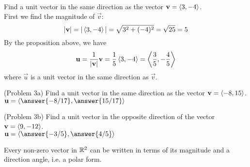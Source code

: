 \documentclass[handout]{ximera}
\begin{document}
\begin{example}[Example 3]
Find a unit vector in the same direction as the vector $\mathbf{v} = \left\langle 3, -4\right\rangle$.\\
First we find the magnitude of $\vec{v}$:
\[
|\mathbf{v}| = |\left\langle 3, -4\right\rangle| = \sqrt{3^2 + (-4)^2} = \sqrt{25} = 5
\]
By the proposition above, we have
\[
\mathbf{u} = \frac{1}{|\mathbf{v}|} \mathbf{v} = \frac15 \left\langle 3, -4\right\rangle = \left\langle \frac35, -\frac45\right\rangle
\]
where $\vec{u}$ is a unit vector in the same direction as $\vec{v}$.
\end{example}

\begin{problem}(Problem 3a)
Find a unit vector in the same direction as the vector $\mathbf{v} = \left\langle -8, 15\right\rangle$.\\
$\vec{u} = \vector{\answer{-8/17}, \answer{15/17}}$
\end{problem}

\begin{problem}(Problem 3b)
Find a unit vector in the opposite direction of the vector $\mathbf{v} = \left\langle 9, -12\right\rangle$.\\
$\vec{u} = \vector{\answer{-3/5}, \answer{4/5}}$
\end{problem}

Every non-zero vector in $\mathbb R^2$ can be written in terms of its magnitude and a direction angle, i.e. a polar form.
\end{document}
